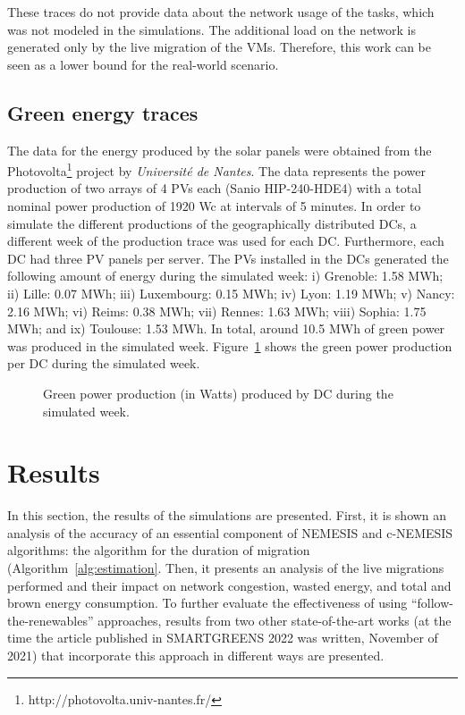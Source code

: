 These traces do not provide data about the network usage of the tasks, which was not modeled in the simulations. The additional load on the network is generated only by the live migration of the VMs. Therefore, this work can be seen as a lower bound for the real-world scenario.


\subsection{Green energy traces}

The data for the energy produced by the solar panels were obtained from the Photovolta\footnote{http://photovolta.univ-nantes.fr/} project by \textit{Université de Nantes}. The data represents the power production of two arrays of 4 PVs each (Sanio HIP-240-HDE4) with a total nominal power production of 1920 Wc at intervals of 5 minutes. In order to simulate the different productions of the geographically distributed DCs,  a different week of the production trace was used for each DC. Furthermore, each DC had three PV panels per server. The PVs installed in the DCs generated the following amount of energy during the simulated week: i) Grenoble: 1.58 MWh; ii) Lille: 0.07 MWh; iii) Luxembourg: 0.15 MWh; iv) Lyon: 1.19 MWh; v) Nancy: 2.16 MWh; vi) Reims: 0.38 MWh; vii) Rennes: 1.63 MWh; viii) Sophia: 1.75 MWh; and ix) Toulouse: 1.53 MWh. In total, around 10.5 MWh of green power was produced in the simulated week. Figure~\ref{fig:green_power} shows the green power production per DC during the simulated week.

 \begin{figure}[!htbp]
  \centering
   {}
  \caption{Green power production (in Watts) produced by DC during the
  simulated week.}
  \label{fig:green_power}
\end{figure}



\section{Results}

\label{sec:results_smargreens}

In this section,  the results of the simulations are presented. First, it is shown an analysis of the accuracy of an essential component of NEMESIS and c-NEMESIS algorithms: the algorithm for the duration of migration (Algorithm~\ref{alg:estimation}. Then,  it presents an analysis of the live migrations performed and their impact on network congestion, wasted energy, and total and brown energy consumption. To further evaluate the effectiveness of using ``follow-the-renewables'' approaches, results from two other state-of-the-art works (at the time the article published in SMARTGREENS 2022 was written, November of 2021) that incorporate this approach in different ways are presented.


